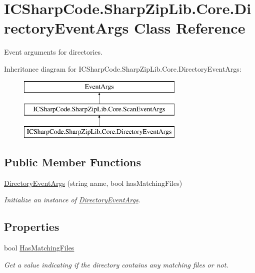 \hypertarget{class_i_c_sharp_code_1_1_sharp_zip_lib_1_1_core_1_1_directory_event_args}{}\section{I\+C\+Sharp\+Code.\+Sharp\+Zip\+Lib.\+Core.\+Directory\+Event\+Args Class Reference}
\label{class_i_c_sharp_code_1_1_sharp_zip_lib_1_1_core_1_1_directory_event_args}


Event arguments for directories.  


Inheritance diagram for I\+C\+Sharp\+Code.\+Sharp\+Zip\+Lib.\+Core.\+Directory\+Event\+Args\+:\begin{figure}[H]
\begin{center}
\leavevmode
\includegraphics[height=3.000000cm]{class_i_c_sharp_code_1_1_sharp_zip_lib_1_1_core_1_1_directory_event_args}
\end{center}
\end{figure}
\subsection*{Public Member Functions}
\begin{DoxyCompactItemize}
\item 
\hyperlink{class_i_c_sharp_code_1_1_sharp_zip_lib_1_1_core_1_1_directory_event_args_a2b53943e8cfd1d189f8e4c8d171d8f8d}{Directory\+Event\+Args} (string name, bool has\+Matching\+Files)
\begin{DoxyCompactList}\small\item\em Initialize an instance of \hyperlink{class_i_c_sharp_code_1_1_sharp_zip_lib_1_1_core_1_1_directory_event_args}{Directory\+Event\+Args}. \end{DoxyCompactList}\end{DoxyCompactItemize}
\subsection*{Properties}
\begin{DoxyCompactItemize}
\item 
bool \hyperlink{class_i_c_sharp_code_1_1_sharp_zip_lib_1_1_core_1_1_directory_event_args_ad501f1a7b95ca5116a14143266345d59}{Has\+Matching\+Files}
\begin{DoxyCompactList}\small\item\em Get a value indicating if the directory contains any matching files or not. \end{DoxyCompactList}\end{DoxyCompactItemize}


